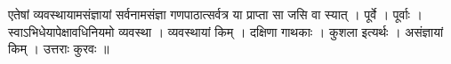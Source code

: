 एतेषां व्यवस्थायामसंज्ञायां सर्वनामसंज्ञा गणपाठात्सर्वत्र या प्राप्ता सा
जसि वा स्यात् । पूर्वे । पूर्वाः । स्वाऽभिधेयापेक्षावधिनियमो व्यवस्था ।
व्यवस्थायां किम् । दक्षिणा गाथकाः । कुशला इत्यर्थः । असंज्ञायां किम् ।
उत्तराः कुरवः ॥
